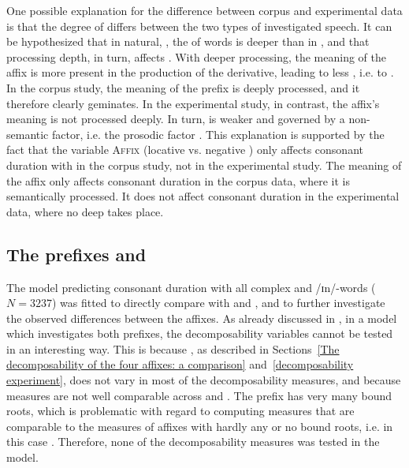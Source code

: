 One possible explanation for the difference between corpus and experimental data is that the degree of  differs between the two types of investigated speech. It can be hypothesized that in natural, ,  the  of words is deeper than in , and that processing depth, in turn, affects . With deeper processing, the meaning of the affix is more present in the production of the derivative, leading to less , i.e. to . 
 In the corpus study, the meaning of the prefix is deeply processed, and it therefore clearly geminates. In the experimental study, in contrast, the affix's meaning is not processed deeply. In turn,  is weaker and governed by a non-semantic factor,  i.e. the prosodic factor .
  This explanation is supported by the fact that the variable \textsc{Affix} (locative  vs. negative ) only affects consonant duration with  in the corpus study, not in the experimental study. The meaning of the affix only affects consonant duration in the corpus data, where it is semantically processed. It does not affect consonant duration in the experimental data, where no deep  takes place.

\subsection{The prefixes  and }
The model predicting consonant duration with all complex  and /ɪn/-words ($N=3237$) was fitted to directly compare  with  and , and to further investigate the observed differences between the affixes.
As already discussed in , in a model which investigates both prefixes, the decomposability variables cannot be tested in an interesting way. This is because , as described in Sections~\ref{The decomposability of the four affixes: a comparison} and~\ref{decomposability experiment}, does not vary in most of the decomposability measures, and because  measures are not well comparable across  and . The prefix  has very many bound roots, which is problematic with regard to computing  measures that are comparable to the  measures of affixes with hardly any or no bound roots, i.e. in this case . Therefore, none of the decomposability measures was tested in the model. 

